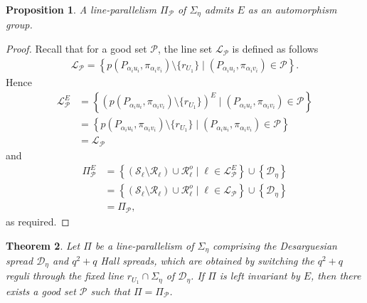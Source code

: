 \documentclass[11pt]{article}
\newtheorem{theorem}{Theorem}[section]
\newtheorem{prop}[theorem]{Proposition}
\theoremstyle{definition}
\numberwithin{equation}{section}
\def\cL{\mathcal L}
\def\cP{\mathcal P}
\def\cD{\mathcal D}
\def\cR{\mathcal R}
\def\cS{\mathcal S}
\begin{document}
\begin{prop}
    A line-parallelism $\Pi_{\cP}$ of $\Sigma_{\eta}$ admits $E$ as an automorphism group.
\end{prop}
\begin{proof}
    Recall that for a good set $\cP$, the line set $\cL_{\cP}$ is defined as follows
    \begin{align*}
    \cL_{\cP} = \left\{p\left(P_{\alpha_{i} u_i}, \pi_{\alpha_{i} v_i}\right) \setminus \{r_{U_1}\} \mid \left(P_{\alpha_{i} u_i}, \pi_{\alpha_{i} v_i}\right) \in \cP \right\}.
    \end{align*}
Hence 
\begin{align*}
    \cL_{\cP}^E & = \left\{\left(p\left(P_{\alpha_{i} u_i}, \pi_{\alpha_{i} v_i}\right) \setminus \{r_{U_1}\}\right)^E \mid \left(P_{\alpha_{i} u_i}, \pi_{\alpha_{i} v_i}\right) \in \cP \right\} \\
    & = \left\{p\left(P_{\alpha_{i} u_i}, \pi_{\alpha_{i} v_i}\right) \setminus \{r_{U_1}\} \mid \left(P_{\alpha_{i} u_i}, \pi_{\alpha_{i} v_i}\right) \in \cP \right\} \\
    & = \cL_{\cP}
\end{align*}
and 
\begin{align*}
\Pi_{\cP}^E & = \left\{ \left(\cS_\ell \setminus \cR_{\ell}\right) \cup {\cR_{\ell}^o} \mid \ell \in \cL_{\cP}^E \right\} \cup \left\{\cD_{\eta}\right\} \\
& = \left\{ \left(\cS_\ell \setminus \cR_{\ell}\right) \cup {\cR_{\ell}^o} \mid \ell \in \cL_{\cP} \right\} \cup \left\{\cD_{\eta}\right\} \\
& = \Pi_{\cP},
\end{align*}
as required.
\end{proof}
\begin{theorem}
Let $\Pi$ be a line-parallelism of $\Sigma_{\eta}$ comprising the Desarguesian spread $\cD_{\eta}$ and
$q^2 + q$ Hall spreads, which are obtained by switching the $q^2 + q$ reguli through
the fixed line $r_{U_1} \cap \Sigma_{\eta}$ of $\cD_{\eta}$. If $\Pi$ is left invariant by $E$, then there exists a good set $\cP$ such that $\Pi = \Pi_{\cP}$.
\end{theorem}
\end{document}

